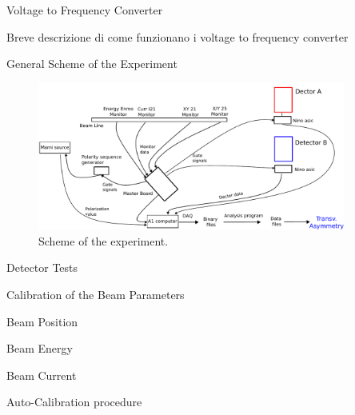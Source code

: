 \documentclass[8pt,a4paper]{beamer}
\begin{document}
\begin{frame}{Voltage to Frequency Converter}

Breve descrizione di come funzionano i voltage to frequency converter

\end{frame}

\begin{frame}{General Scheme of the Experiment}

\begin{figure}[hbtp]
\centering
\includegraphics[width = 0.9\textwidth]{figures/Electronic_scheme.pdf}
\caption{Scheme of the experiment.}
\end{figure}
\end{frame}

\begin{frame}{Detector Tests}

\end{frame}

\begin{frame}{Calibration of the Beam Parameters}

\end{frame}

\begin{frame}{Beam Position}

\end{frame}

\begin{frame}{Beam Energy}

\end{frame}

\begin{frame}{Beam Current}

\end{frame}

\begin{frame}{Auto-Calibration procedure}

\end{frame}
\end{document}
